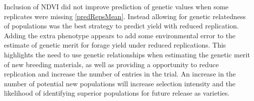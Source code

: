 \documentclass[12pt, letterpaper]{article}
\begin{document}
Inclusion of NDVI did not improve prediction of genetic values when some replicates were missing \ref{predRepsMean}. Instead allowing for genetic relatedness of populations was the best strategy to predict yield with reduced replication. Adding the extra phenotype appears to add some environmental error to the estimate of genetic merit for forage yield under reduced replications. This highlights the need to use genetic relationships when estimating the genetic merit of new breeding materials, as well as providing a opportunity to reduce replication and increase the number of entries in the trial. An increase in the number of potential new populations will increase selection intensity and the likelihood of identifying superior populations for future release as varieties.


\end{document}
